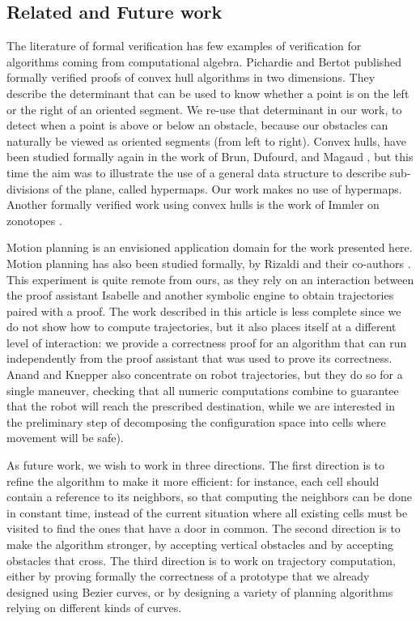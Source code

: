 \documentclass[a4paper, USenglish, cleveref, autoref, thm-restate, final]{lipics-v2021}
\begin{document}
\subsection{Related and Future work}
The literature of formal verification has few examples of verification for
algorithms coming from computational algebra.  Pichardie and Bertot
\cite{pichardie:hal-01702679} published
formally verified proofs of convex hull algorithms in two dimensions.  They
describe the determinant that can be used to know whether a point is on the
left or the right of an oriented segment.  We re-use that determinant in our
work, to detect when a point is above or below an obstacle, because our
obstacles can naturally be viewed as oriented segments (from left to right).
Convex hulls, have been studied formally again in the work of Brun, Dufourd,
and Magaud \cite{brun:hal-00955400}, but this time the aim was to illustrate
the use of a general data structure to describe sub-divisions of the plane,
called hypermaps.  Our work makes no use of hypermaps.  Another formally
verified work using convex hulls is the work of Immler on
zonotopes \cite{ImmlerZonotopes15}.

Motion planning is an envisioned application domain for the work presented
here.  Motion planning has also been studied formally, by Rizaldi and 
their co-authors \cite{Rizaldietal18}.  This experiment is quite remote from
ours, as they rely on an interaction between the proof assistant {\sc Isabelle}
and another symbolic engine to obtain trajectories paired with a proof.  The
work described in this article is less complete since we do not show how
to compute trajectories, but it also places itself at a different level of
interaction: we provide a correctness proof for an algorithm that can run
independently from the proof assistant that was used to prove its correctness.
Anand and Knepper \cite{AnandRoscoq15} also concentrate on robot
trajectories, but they do so for a single maneuver, checking that all
numeric computations combine to guarantee that the robot will reach the
prescribed destination, while we are interested in the preliminary step
of decomposing the configuration space into cells where movement will be safe).

As future work, we wish to work in three directions.  The first direction
is to refine the algorithm to make it more efficient: for instance,
each cell should contain a reference to its neighbors, so that computing
the neighbors can be done in constant time, instead of the current situation
where all existing cells must be visited to find the ones that have a door
in common.  The second direction is to make the algorithm stronger, 
by accepting vertical obstacles and by accepting obstacles that cross.
The third direction is to work on trajectory computation, either by proving
formally the correctness of a prototype that we already designed using
Bezier curves, or by
designing a variety of planning algorithms relying on different kinds
of curves.

\end{document}
